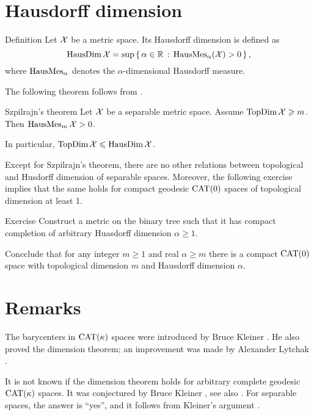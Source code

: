 \section{Hausdorff dimension}

\begin{thm}{Definition}
\label{def:HausDim}
Let $\mathcal{X}$ be a metric space. 
Its Hausdorff dimension is defined as
\[\mathop{\rm HausDim}\nolimits\mathcal{X}=\sup\left\{\,{\alpha\in\mathbb{R}}\,:\,{\mathop{\rm HausMes}\nolimits_\alpha(\mathcal{X})>0}\,\right\},\]
where $\mathop{\rm HausMes}\nolimits_\alpha$ denotes the $\alpha$-dimensional Hausdorff measure.
\end{thm}

The following theorem follows from \cite[theorems V 8 and VII 2]{hurewicz-wallman}.

\begin{thm}{Szpilrajn's theorem}\label{thm:szpilrajn} 
Let $\mathcal{X}$ be a separable metric space.
Assume $\mathop{\rm TopDim}\nolimits\mathcal{X}\geqslant m$.
Then $\mathop{\rm HausMes}\nolimits_m \mathcal{X}>0$.

In particular, 
$\mathop{\rm TopDim}\nolimits\mathcal{X}\leqslant\mathop{\rm HausDim}\nolimits\mathcal{X}$.
\end{thm}

Except for Szpilrajn's theorem, there are no other relations between topological and Husdorff dimension of separable spaces.
Moreover, the following exercise implies that the same holds for compact geodesic $\mathrm{CAT}(0)$ spaces of topological dimension at least 1.

\begin{thm}{Exercise}\label{ex:dim-top-haus-CAT}
Construct a metric on the binary tree such that it has compact completion of arbitrary Huasdorff dimension $\alpha\ge 1$.

Concclude that for any integer $m\ge 1$ and real $\alpha\ge m$ there is a compact $\mathrm{CAT}(0)$ space with topological dimension $m$ and Hausdorff dimension $\alpha$. 
\end{thm}


\section{Remarks}

The barycenters in $\mathrm{CAT}(\kappa)$ spaces were introduced by Bruce Kleiner \cite{kleiner}.
He also proved the dimension theorem; an improvement was made by Alexander Lytchak \cite{lytchak:diff}.

It is not known if the dimension theorem holds for arbitrary complete geodesic $\mathrm{CAT}(\kappa)$ spaces.
It was conjectured by Bruce Kleiner \cite{kleiner}, see also \cite[p.~133]{gromov:asymt-inv}.
For separable spaces, the answer is ``yes'', and it follows from Kleiner's argument \cite[Corollary 14.13]{alexander-kapovitch-petrunin-2025}.

